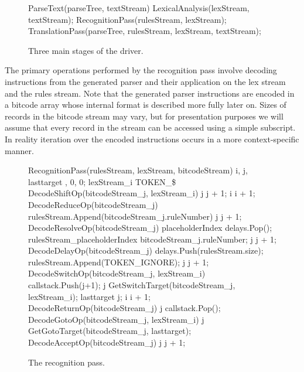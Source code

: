 \documentclass[envcountsame,runningheads]{llncs}
\begin{document}
\begin{figure}[!ht]
\centering
\begin{gcl}
\PROC ParseText(parseTree, textStream)
LexicalAnalysis(lexStream, textStream);
RecognitionPass(rulesStream, lexStream);
TranslationPass(parseTree, rulesStream, lexStream, textStream);
\CORP
\end{gcl}
\vspace{-2.5\baselineskip}
\caption{Three main stages of the driver.}
\end{figure}

The primary operations performed by the recognition pass involve decoding instructions from the generated parser and their application on the lex stream and the rules stream. 
Note that the generated parser instructions are encoded in a bitcode array whose internal format is described more fully later on.
Sizes of records in the bitcode stream may vary, but for presentation purposes we will assume that every record in the stream can be accessed using a simple subscript.
In reality iteration over the encoded instructions occurs in a more context-specific manner.

\clearpage
\begin{figure}[!ht]
\centering
\begin{gcl}
\PROC RecognitionPass(rulesStream, lexStream, bitcodeStream)
    i, j, lasttarget , 0, 0;    
    \DO lexStream_i \neq TOKEN\_\$ \rightarrow
      \IF DecodeShiftOp(bitcodeStream_j, lexStream_i) \rightarrow
      \quad j \becomes j + 1;
      \quad i \becomes i + 1;
      \BAR DecodeReduceOp(bitcodeStream_j) \rightarrow
      \quad rulesStream.Append(bitcodeStream_j.ruleNumber)
      \quad j \becomes j + 1;
      \BAR DecodeResolveOp(bitcodeStream_j) \rightarrow
      \quad placeholderIndex \becomes delays.Pop();
      \quad rulesStream_{placeholderIndex} \becomes bitcodeStream_j.ruleNumber;
      \quad j \becomes j + 1;
      \BAR DecodeDelayOp(bitcodeStream_j) \rightarrow
      \quad delays.Push(rulesStream.size);
      \quad rulesStream.Append(TOKEN\_IGNORE);
      \quad j \becomes j + 1;
      \BAR DecodeSwitchOp(bitcodeStream_j, lexStream_i) \rightarrow
      \quad callstack.Push(j+1);
      \quad j \becomes GetSwitchTarget(bitcodeStream_j, lexStream_i);
      \quad lasttarget \becomes j;
      \quad i \becomes i + 1;
      \BAR DecodeReturnOp(bitcodeStream_j) \rightarrow
      \quad j \becomes callstack.Pop();
      \BAR DecodeGotoOp(bitcodeStream_j, lexStream_i) \rightarrow
      \quad j \becomes GetGotoTarget(bitcodeStream_j, lasttarget);
      \BAR DecodeAcceptOp(bitcodeStream_j) \rightarrow
      \quad j \becomes j + 1;
    \FI
  \OD
\CORP
\end{gcl}
\vspace{-2.5\baselineskip}
\caption{The recognition pass.}
\end{figure}
\end{document}
